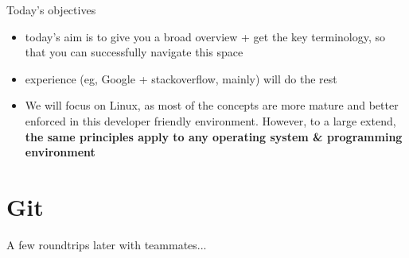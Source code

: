 \documentclass[compress]{beamer}
\begin{document}
\begin{frame}{Today's objectives}
{\begin{itemize}
            \item today's aim is to give you a broad overview + get the key
                terminology, so that you can successfully navigate this space

            \item experience (eg, Google + stackoverflow, mainly) will do the rest

            \item We will focus on Linux, as most of the concepts are more
                mature and better enforced in this developer friendly
                environment. However, to a large extend, {\bf the same
                principles apply to any operating system \& programming
                environment}

        \end{itemize}

    }
\end{frame}



\section{Git}



\begin{frame}[plain]
    A few roundtrips later with teammates...
\end{frame}


{
    \begin{frame}[plain]{}
    \end{frame}
}
\end{document}
